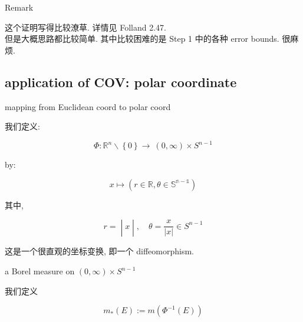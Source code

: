 \documentclass{qlnotes-export}
\begin{document}
\begin{qlremark}{Remark}

这个证明写得比较潦草. 详情见 Folland 2.47.\\
但是大概思路都比较简单. 其中比较困难的是 Step 1 中的各种 error bounds. 很麻烦.\\

\end{qlremark}

\subsection{application of COV: polar coordinate}\label{application-of-cov-polar-coordinate}

\begin{definition}{mapping from Euclidean coord to polar coord}\label{def-07-lebesgue-measure-on-r-n-mapping-from-euclidean-coord-to-polar-coord}

我们定义:

\[\Phi:{\mathbb{R}}^{n}\backslash\left\{ 0 \right\}\rightarrow\ (0,\infty) \times S^{n - 1}\]

by:

\[x\mapsto(r \in {\mathbb{R}},\theta \in {\mathbb{S}}^{{\mathbb{n}} - \mathbb{1}})\]

其中,

\[\left. r = \middle| x \middle| ,\quad\theta = \frac{x}{|x|} \in S^{n - 1} \right.\]

\end{definition}

这是一个很直观的坐标变换, 即一个 diffeomorphism.\\

\begin{definition}{a Borel measure on \((0,\infty) \times S^{n - 1}\)}\label{def-07-lebesgue-measure-on-r-n-a-borel-measure-on-0-infty-times-s-n-1}

我们定义

\[m_{\ast}(E) := m(\Phi^{- 1}(E))\]

\end{definition}
\end{document}

